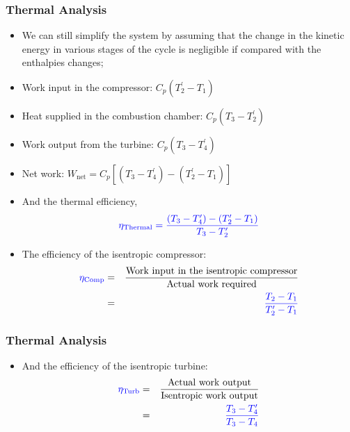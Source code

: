 \documentclass[10pt,compress]{beamer}
\newcommand{\frc}{\displaystyle\frac}
\begin{document}
\begin{frame}
 \frametitle{Thermal Analysis}
 \begin{itemize}
  \item <1-> We can still simplify the system by assuming that the change in the kinetic energy in various stages of the cycle is negligible if compared with the enthalpies changes;
  \item <2-> Work input in the compressor: $C_{p}\left(T_{2}^{\prime}-T_{1}\right)$
  \item <3-> Heat supplied in the combustion chamber: $C_{p}\left(T_{3}-T_{2}^{\prime}\right)$
  \item <4-> Work output from the turbine: $C_{p}\left(T_{3}-T_{4}^{\prime}\right)$
  \item <5-> Net work: $W_{\text{net}}=C_{p}\left[\left(T_{3}-T_{4}^{\prime}\right) - \left(T_{2}^{\prime}-T_{1}\right)\right]$
  \item <6-> And the thermal efficiency,
      \begin{displaymath}
       \textcolor{blue}{\eta_{\text{Thermal}} = \frc{\left(T_{3}-T_{4}^{\prime}\right) - \left(T_{2}^{\prime}-T_{1}\right)}{T_{3}-T_{2}^{\prime}}}
      \end{displaymath}
  \item <7-> The efficiency of the isentropic compressor:
      \begin{eqnarray}
        \textcolor{blue}{\eta_{\text{Comp}}}&=&\frc{\text{Work input in the isentropic compressor}}{\text{Actual work required}} \nonumber \\
                                          &=& \textcolor{blue}{\frc{T_{2}-T_{1}}{T_{2}^{\prime}-T_{1}}}\nonumber
      \end{eqnarray}
 \end{itemize}
\end{frame}



\begin{frame}
 \frametitle{Thermal Analysis}
 \begin{itemize}
  \item <1-> And the efficiency of the isentropic turbine:
      \begin{eqnarray}
        \textcolor{blue}{\eta_{\text{Turb}}}&=&\frc{\text{Actual work output}}{\text{Isentropic work output}} \nonumber \\
                                          &=& \textcolor{blue}{\frc{T_{3}-T_{4}^{\prime}}{T_{3}-T_{4}}}\nonumber
      \end{eqnarray}
   \end{itemize}
\end{frame}
\end{document}
